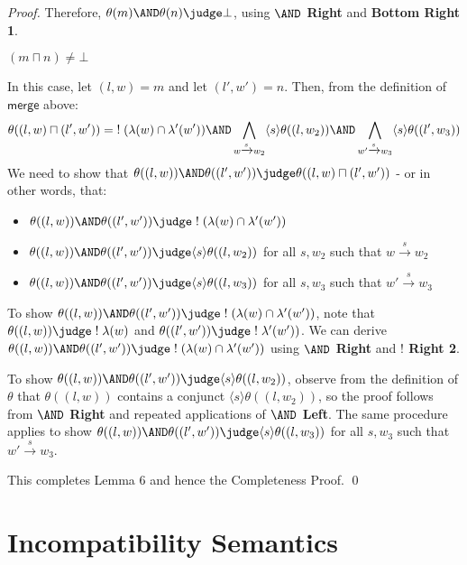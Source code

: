 \begin{proof}
Therefore,  $\theta(m) \AND \theta(n) \judge \bot$, using  {\bf $\AND$ Right} and  {\bf Bottom Right 1}.
\begin{mycase}
$(m \sqcap n) \neq \bot$
\end{mycase}
In this case, let $(l,w) = m$ and let $(l',w')=n$.
Then, from the definition of $\mathsf{merge}$ above:
\[
\theta((l,w) \sqcap (l',w')) = \; ! \; (\lambda(w) \cap \lambda'(w')) \AND \bigwedge_{w \xrightarrow{s} w_2} \langle s \rangle \theta((l, w_2)) \AND \bigwedge_{w' \xrightarrow{s} w_3} \langle s \rangle \theta((l', w_3))
\]
We need to show that $\theta((l,w)) \AND \theta((l',w')) \judge \theta((l,w) \sqcap (l',w'))$ - or in other words, that:
\begin{itemize}
\item
$\theta((l,w)) \AND \theta((l',w')) \judge \; ! \; (\lambda(w) \cap \lambda'(w'))$
\item
$\theta((l,w)) \AND \theta((l',w')) \judge \langle s \rangle \theta((l, w_2))$ for all $s,w_2$ such that $w \xrightarrow{s} w_2$
\item
$\theta((l,w)) \AND \theta((l',w')) \judge \langle s \rangle \theta((l, w_3))$ for all $s,w_3$ such that $w' \xrightarrow{s} w_3$
\end{itemize}
To show $\theta((l,w)) \AND \theta((l',w')) \judge \; ! \; (\lambda(w) \cap \lambda'(w'))$, note that $\theta((l,w))  \judge \; ! \; \lambda(w)$ and $\theta((l',w')) \judge \; ! \;  \lambda'(w'))$.
We can derive $\theta((l,w)) \AND \theta((l',w')) \judge \; ! \; (\lambda(w) \cap \lambda'(w'))$ using {\bf $\AND$ Right} and {\bf $!$ Right 2}. 

To show $\theta((l,w)) \AND \theta((l',w')) \judge \langle s \rangle \theta((l, w_2))$, observe from the definition of $\theta$ that $\theta((l,w))$ contains a conjunct $\langle s \rangle \theta((l, w_2))$, so the proof follows from  {\bf $\AND$ Right} and repeated applications of  {\bf $\AND$ Left}. The same procedure applies to show $\theta((l,w)) \AND \theta((l',w')) \judge \langle s \rangle \theta((l, w_3))$ for all $s,w_3$ such that $w' \xrightarrow{s} w_3$.

This completes Lemma 6 and hence the Completeness Proof.
\qed

\end{proof}

\section{Incompatibility Semantics}

